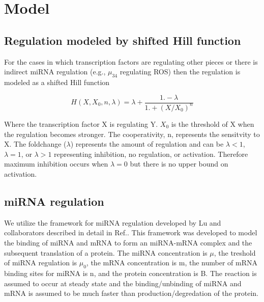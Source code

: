 \documentclass{article}
\begin{document}

\section{Model}

\subsection{Regulation modeled by shifted Hill function}

For the cases in which transcription factors are regulating other pieces or there is indirect miRNA regulation (e.g., $\mu_{34}$ regulating ROS) then the regulation is modeled as a shifted Hill function

\begin{equation}
H(X, X_0, n, \lambda)= \lambda+\frac{1.-\lambda}{1.+(X/X_0)^{n}}
\end{equation}

Where the transcription factor X is regulating Y. 
$X_0$ is the threshold of X when the regulation becomes stronger. 
The cooperativity, n, represents the sensitvity to X.
The foldchange ($\lambda$)  represents the amount of regulation and can be $\lambda<1$, $\lambda=1$, or $\lambda>1$ representing inhibition, no regulation, or activation. 
Therefore maximum inhibition occurs when $\lambda=0$ but there is no upper bound on activation.

\FloatBarrier
\subsection{miRNA regulation}
We utilize the framework for miRNA regulation developed by Lu and collaborators described in detail in Ref.\cite{Lu2013}.
This framework was developed to model the binding of miRNA and mRNA to form an miRNA-mRNA complex and the subsequent translation of a protein. 
The miRNA concentration is $\mu$, the treshold of miRNA regulation is $\mu_0$, the mRNA concentration is m, the number of mRNA binding sites for miRNA is n, and the protein concentration is B.
The reaction is assumed to occur at steady state and the binding/unbinding of miRNA and mRNA is assumed to be much faster than production/degredation of the protein.
\end{document}
